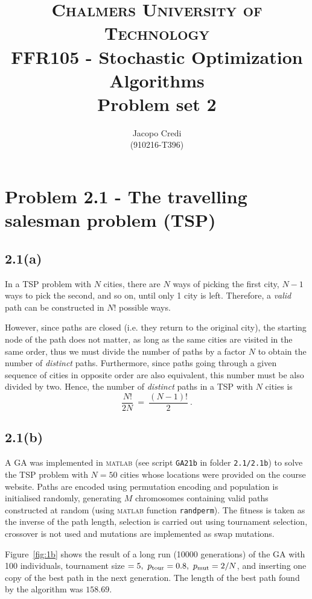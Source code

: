 \documentclass[12pt,titlepage]{article}
\author{Jacopo Credi \\(910216-T396) \\ \vspace*{2cm} }
\title{{\Large \textsc{Chalmers University of Technology}} \\ \bigskip FFR105 - Stochastic Optimization Algorithms\\ \bigskip Problem set 2 \\ \vspace*{2cm}}
\begin{document}
\parindent=0cm
\maketitle


\section*{Problem 2.1 - The travelling salesman problem (TSP)}
\setcounter{page}{1}

\subsection*{2.1(a)}
In a TSP problem with $N$ cities, there are $N$ ways of picking the first city, $N-1$ ways to pick the second, and so on, until only 1 city is left. Therefore, a \emph{valid} path can be constructed in $N!$ possible ways. 

However, since paths are closed (i.e. they return to the original city), the starting node of the path does not matter, as long as the same cities are visited in the same order, thus we must divide the number of paths by a factor $N$ to obtain the number of \emph{distinct} paths.
Furthermore, since paths going through a given sequence of cities in opposite order are also equivalent, this number must be also divided by two.
Hence, the number of \emph{distinct} paths in a TSP with $N$ cities is
\[
\dfrac{N!}{2 N} \ = \ \dfrac{(N-1)!}{2} \  .
\]

\vspace*{-0.7cm}
\subsection*{2.1(b)}

A GA was implemented in \textsc{matlab} (see script \texttt{GA21b} in folder \texttt{2.1/2.1b}) to solve the TSP problem with $N = 50$ cities whose locations were provided on the course website. Paths are encoded using permutation encoding and population is initialised randomly, generating $M$ chromosomes containing valid paths constructed at random (using \textsc{matlab} function \texttt{randperm}). The fitness is taken as the inverse of the path length, selection is carried out using tournament selection, crossover is not used and mutations are implemented as swap mutations.

Figure~\ref{fig:1b} shows the result of a long run (10000 generations) of the GA with 100 individuals, tournament size $= 5, \ p_{\textup{tour}} = 0.8, \ p_{\textup{mut}} = 2/N$, and inserting one copy of the best path in the next generation.
The length of the best path found by the algorithm was $158.69$.\enlargethispage{\baselineskip}
\end{document}

